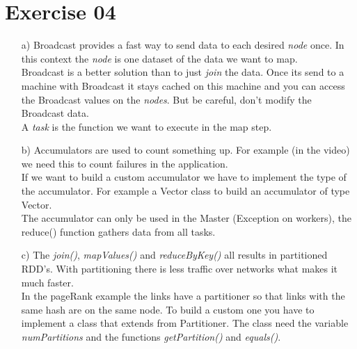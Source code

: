 \documentclass[11pt,a4paper]{scrartcl}
\begin{document}
\section*{Exercise 04}
	\begin{itemize}
		\item [a)] Broadcast provides a fast way to send data to each desired \textit{node} once. In this context the \textit{node} is one dataset of the data we want to map.\\ 
Broadcast is a better solution than to just \textit{join} the data. Once its send to a machine with Broadcast it stays cached on this machine and you can access the Broadcast values on the \textit{nodes}. But be careful, don't modify the Broadcast data.\\
A \textit{task} is the function we want to execute in the map step.
		\item [b)] Accumulators are used to count something up. For example (in the video) we need this to count failures in the application.\\
If we want to build a custom accumulator we have to implement the type of the accumulator. For example a Vector class to build an accumulator of type Vector.\\
The accumulator can only be used in the Master (Exception on workers), the reduce() function gathers data from all tasks.
		\item [c)] The \textit{join()}, \textit{mapValues()} and \textit{reduceByKey()} all results in partitioned RDD’s. With partitioning there is less traffic over networks what makes it much faster.\\
In the pageRank example the links have a partitioner so that links with the same hash are on the same node. To build a custom one you have to implement a class that extends from Partitioner. The class need the variable \textit{numPartitions} and the functions \textit{getPartition()} and \textit{equals()}.
	\end{itemize}
\end{document}
